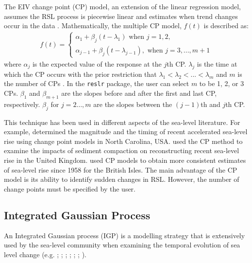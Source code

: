 The EIV change point (CP) model, an extension of the linear regression model, assumes the RSL process is piecewise linear and estimates when trend changes occur in the data \citep{Cahill2015_cp}. Mathematically, the multiple CP model, \(f(t)\) is described as:
\begin{align}
     f(t) = 
     \begin{cases}
      \alpha_1 + \beta_j(t - \lambda_1) \text{ when } j = 1,2,\\
      \alpha_{j-1} + \beta_j(t - \lambda_{j-1}),  \text{ when } j = 3,..., m+1
    \end{cases}
 \end{align}
where \(\alpha_j\) is the expected value of the response at the \(j\)th CP. \(\lambda_j\) is the time at which the CP occurs with the prior restriction that \(\lambda_1 < \lambda_2 < ... < \lambda_m\) and \(m\) is the number of CPs \citep{Cahill2015_cp}. In the \texttt{reslr} package, the user can select \(m\) to be 1, 2, or 3 CPs. \(\beta_{1}\) and \(\beta_{m+1}\) are the slopes before and after the first and last CP, respectively. \(\beta_j\) for \(j=2\ldots,m\) are the slopes between the \((j-1)\)th and \(j\)th CP.

This technique has been used in different aspects of the sea-level literature. For example, \citet{Kemp2009} determined the magnitude and the timing of recent accelerated sea-level rise using change point models in North Carolina, USA. \citet{Brain2012} used the CP method to examine the impacts of sediment compaction on reconstructing recent sea-level rise in the United Kingdom. \citet{Hogarth2020} used CP models to obtain more consistent estimates of sea-level rise since 1958 for the British Isles. The main advantage of the CP model is its ability to identify sudden changes in RSL. However, the number of change points must be specified by the user.

\subsection{Integrated Gaussian Process}\label{integratedgaussianprocess}

An Integrated Gaussian process (IGP) is a modelling strategy that is extensively used by the sea-level community when examining the temporal evolution of sea level change (e.g. \citet{Cahill2015aStats}; \citet{Hawkes2016}; \citet{Kemp2017}; \citet{Shaw2018}; \citet{Dean2019}; \citet{Stearns2023}; \citet{Kirby2023}).

